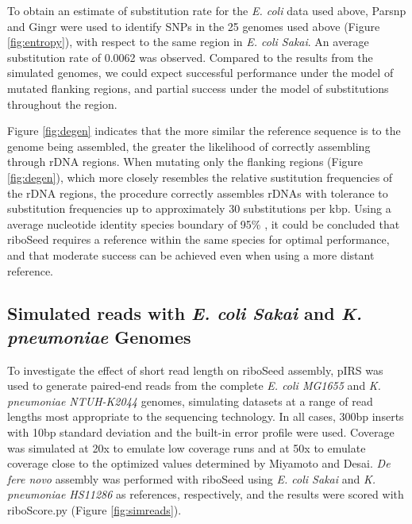 \documentclass[a4,center,fleqn]{NAR}
\begin{document}
To obtain an estimate of substitution rate for the \textit{E. coli} data used above, Parsnp\cite{Treangen2014} and Gingr\cite{Treangen2014} were used to identify SNPs in the 25 genomes used above (Figure \ref{fig:entropy}), with respect to the same region in \textit{E. coli Sakai}. An average substitution rate of 0.0062 was observed. Compared to the results from the simulated genomes, we could expect successful performance under the model of mutated flanking regions, and partial success under the model of substitutions throughout the region.


Figure \ref{fig:degen} indicates that the more similar the reference sequence is to the genome being assembled, the greater the likelihood of correctly assembling through rDNA regions. When mutating only the flanking regions (Figure \ref{fig:degen}), which more closely resembles the relative sustitution frequencies of the rDNA regions, the procedure correctly assembles rDNAs with tolerance to substitution frequencies up to approximately 30 substitutions per kbp.  Using a average nucleotide identity species boundary of 95\% \cite{Goris2007a}, it could be concluded that riboSeed requires a reference within the same species for optimal performance, and that moderate success can be achieved even when using a more distant reference.

\subsection*{Simulated reads with \textit{E. coli Sakai} and \textit{K. pneumoniae} Genomes}


To investigate the effect of short read length on riboSeed assembly, pIRS\cite{Hu2012} was used to generate paired-end reads from the complete \textit{E. coli MG1655} and \textit{K. pneumoniae NTUH-K2044} genomes, simulating datasets at a range of read lengths most appropriate to the sequencing technology. In all cases, 300bp inserts with 10bp standard deviation and the built-in error profile were used. Coverage was simulated at 20x to emulate low coverage runs and at 50x to emulate coverage close to the optimized values determined by Miyamoto\cite{Miyamoto2014} and Desai\cite{Desai2013}. \textit{De fere novo} assembly was performed with riboSeed using \textit{E. coli Sakai} and \textit{K. pneumoniae HS11286} as references, respectively, and the results were scored with riboScore.py (Figure \ref{fig:simreads}).
\end{document}
